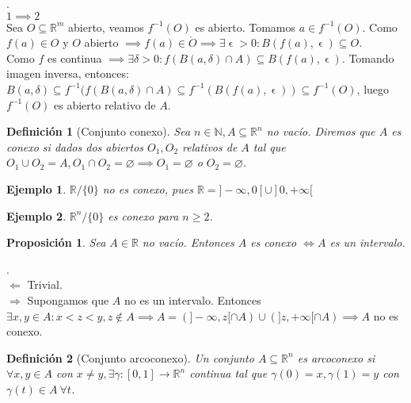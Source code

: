 \documentclass[11pt, a4paper]{article}
\makeatletter
\newif\IfInSansMode
\let\oldsf\sffamily
\renewcommand*{\sffamily}{\oldsf\mathversion{sans}\InSansModetrue}
\let\oldnorm\normalfont
\renewcommand*{\normalfont}{\oldnorm\InSansModefalse\mathversion{normal}}
\let\epsilon\upvarepsilon
\newcommand{\R}{\mathbb{R}} \newcommand{\N}{\mathbb{N}}
\renewenvironment{proof}[1][\proofname] {\par\pushQED{\qed}\normalfont\topsep6\p@\@plus6\p@\relax\trivlist\item[\hskip\labelsep\itshape\sffamily#1\@addpunct{.}]\ignorespaces}{\popQED\endtrivlist\@endpefalse}
\theoremstyle{theorem-style}
\newtheorem{nprop}{Proposición}[section]
\theoremstyle{definition-style}
\newtheorem{ndef}{Definición}[section]
\theoremstyle{remark-style}
\theoremstyle{example-style}
\newtheorem{ejemplo}{Ejemplo}[section]
\makeatother
\begin{document}
\begin{proof}.
\\ $1 \implies 2$ \\ Sea $O \subseteq \R^m$ abierto, veamos $  f^{-1}(O) $ es abierto. Tomamos $a \in f^{-1}(O)$. Como $f(a) \in O$ y $O$ abierto $ \implies f(a) \in \mathring{O} \implies \exists \epsilon > 0: B(f(a),\epsilon) \subseteq O$. \\

Como $f$ es continua $ \implies \exists \delta > 0: f(B(a,\delta) \cap A) \subseteq B(f(a),\epsilon)$. Tomando imagen inversa, entonces: $ B(a,\delta) \subseteq f^{-1}(f(B(a,\delta) \cap A) \subseteq f^{-1}(B(f(a),\epsilon)) \subseteq f^{-1}(O)$, luego $f^{-1}(O)$ es abierto relativo de $A$.
\end{proof}

\begin{ndef}[Conjunto conexo]
Sea $n \in \N, A \subseteq \R^n$ no vacío. Diremos que $A$ es conexo si dados dos abiertos $O_1,O_2$ relativos de $A$ tal que $O_1 \cup O_2 = A, O_1 \cap O_2 = \varnothing \implies O_1 = \varnothing $ o $O_2 = \varnothing$.
\end{ndef}

\begin{ejemplo}
$\R / \{0\}$ no es conexo, pues $\R = ]-\infty,0[ \cup ]0,+\infty[$
\end{ejemplo}

\begin{ejemplo}
	$\R^n / \{0\}$ es conexo para $n \ge 2$.
\end{ejemplo}

\begin{nprop}
	Sea $A \in \R$ no vacío. Entonces $A$ es conexo $\Longleftrightarrow A$ es un intervalo.
\end{nprop}

\begin{proof}.
	\\ $\boxed{\Leftarrow}$ Trivial.
	\\ $\boxed{\Rightarrow}$ Supongamos que $A$ no es un intervalo. Entonces $ \exists x,y \in A: x<z<y, z \not\in A \implies A = (]-\infty,z[\cap A)\cup(]z,+\infty[\cap A) \implies A$ no es conexo.
\end{proof}

\begin{ndef}[Conjunto arcoconexo]
Un conjunto $A \subseteq \R^n$ es arcoconexo si $ \forall x,y \in A $ con $ x \ne y, \exists \gamma:[0,1] \to \R^n$ continua tal que $ \gamma(0)=x, \gamma(1)=y $ con $ \gamma(t) \in A \ \forall t$.
\end{ndef}
\end{document}
